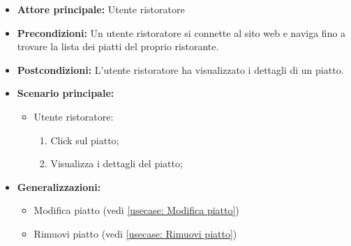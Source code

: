 \label{usecase:Dettaglio piatto}
\begin{itemize}
	\item \textbf{Attore principale:}  Utente ristoratore
	\item \textbf{Precondizioni:}
	      Un utente ristoratore si connette al sito web e naviga fino a trovare la
	      lista dei piatti del proprio ristorante.
	\item \textbf{Postcondizioni:}
	      L'utente ristoratore ha visualizzato i dettagli di un piatto.
	\item \textbf{Scenario principale:}
	      \begin{itemize}
		      \item  Utente ristoratore:
		            \begin{enumerate}
			            \item Click sul piatto;
			            \item Visualizza i dettagli del piatto;
		            \end{enumerate}
	      \end{itemize}
	\item \textbf{Generalizzazioni:}
	      \begin{itemize}
		      \item  Modifica piatto (vedi \autoref{usecase: Modifica piatto})
		      \item  Rimuovi piatto (vedi \autoref{usecase: Rimuovi piatto})
	      \end{itemize}
\end{itemize}
